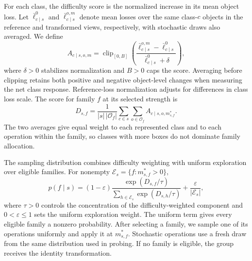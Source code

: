 \documentclass[conference]{IEEEtran}
\begin{document}
For each class, the difficulty score is the normalized increase in its mean object loss. Let $\bar\ell^0_{c\mid s}$ and $\bar\ell^{o,m}_{c\mid s}$ denote mean losses over the same class-$c$ objects in the reference and transformed views, respectively, with stochastic draws also averaged. We define
\begin{equation}
 A_{c\mid s,o,m}=\operatorname{clip}_{[0,B]}
 \left(\frac{\bar\ell^{o,m}_{c\mid s}-\bar\ell^0_{c\mid s}}
 {\bar\ell^0_{c\mid s}+\delta}\right),
 \label{eq:class_difficulty}
\end{equation}
where $\delta>0$ stabilizes normalization and $B>0$ caps the score. Averaging before clipping retains both positive and negative object-level changes when measuring the net class response. Reference-loss normalization adjusts for differences in class loss scale. The score for family $f$ at its selected strength is
\begin{equation}
 D_{s,f}=\frac{1}{|s|\,|\mathcal{O}_f|}
 \sum_{c\in s}\sum_{o\in\mathcal{O}_f}
 A_{c\mid s,o,m^*_{s,f}}.
 \label{eq:family_score}
\end{equation}
The two averages give equal weight to each represented class and to each operation within the family, so classes with more boxes do not dominate family allocation.

The sampling distribution combines difficulty weighting with uniform exploration over eligible families. For nonempty $\mathcal{E}_s=\{f:m^*_{s,f}>0\}$,
\begin{equation}
 p(f\mid s)=(1-\varepsilon)
 \frac{\exp(D_{s,f}/\tau)}
      {\sum_{h\in\mathcal{E}_s}\exp(D_{s,h}/\tau)}
 +\frac{\varepsilon}{|\mathcal{E}_s|},
 \label{eq:family_probability}
\end{equation}
where $\tau>0$ controls the concentration of the difficulty-weighted component and $0<\varepsilon\leq1$ sets the uniform exploration weight. The uniform term gives every eligible family a nonzero probability. After selecting a family, we sample one of its operations uniformly and apply it at $m^*_{s,f}$. Stochastic operations use a fresh draw from the same distribution used in probing. If no family is eligible, the group receives the identity transformation.
\end{document}
